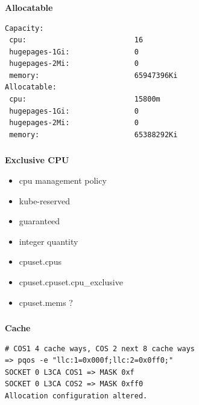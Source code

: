 \documentclass[usenames,dvipsnames, 18pt, compress, aspectratio=169]{beamer}
\begin{document}
\begin{frame}[fragile]{}
    \frametitle{}
    \begin{center}
        \textbf{Allocatable}

        \begin{flushleft}
        \begin{verbatim}
Capacity:
 cpu:                         16
 hugepages-1Gi:               0
 hugepages-2Mi:               0
 memory:                      65947396Ki
Allocatable:
 cpu:                         15800m
 hugepages-1Gi:               0
 hugepages-2Mi:               0
 memory:                      65388292Ki
        \end{verbatim}
        \end{flushleft}

    \end{center}
\end{frame}

\begin{frame}[fragile]{}
    \frametitle{}
    \begin{center}
        \textbf{Exclusive CPU}

        \begin{itemize}[]
            \item cpu management policy
            \item kube-reserved
			\item guaranteed
			\item integer quantity
            \item cpuset.cpus
            \item cpuset.cpuset.cpu\_exclusive
            \item cpuset.mems ?
        \end{itemize}

    \end{center}
\end{frame}

\begin{frame}[fragile]{}
    \frametitle{}
    \begin{center}
        \textbf{Cache}

        \begin{flushleft}
		\begin{verbatim}
# COS1 4 cache ways, COS 2 next 8 cache ways
=> pqos -e "llc:1=0x000f;llc:2=0x0ff0;"
SOCKET 0 L3CA COS1 => MASK 0xf
SOCKET 0 L3CA COS2 => MASK 0xff0
Allocation configuration altered.
        \end{verbatim}
        \end{flushleft}

    \end{center}
\end{frame}
\end{document}
